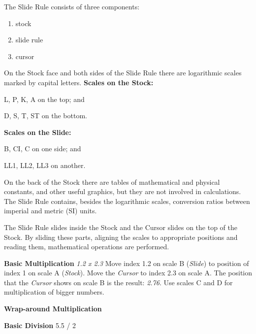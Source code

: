 \documentclass[a4paper,9pt]{article}
\begin{document}
  \begin{multicols*}{3}
  The Slide Rule consists of three components:
    \begin{enumerate}
      \setlength{\parskip}{0pt}
      \setlength{\parsep}{0pt}
      \item stock
      \item slide rule
      \item cursor
    \end{enumerate}

  On the Stock face and both sides of the Slide Rule there are logarithmic scales marked by capital letters. \textbf{Scales on the Stock:}
  \begin{inparaenum}
    \item L, P, K, A on the top; and
    \item D, S, T, ST on the bottom.
  \end{inparaenum}
  \textbf{Scales on the Slide:}
  \begin{inparaenum}
    \item B, CI, C on one side; and
    \item LL1, LL2, LL3 on another.
  \end{inparaenum}

  On the back of the Stock there are tables of mathematical and physical constants, and other useful graphics, but they are not involved in calculations. The Slide Rule contains, besides the logarithmic scales, conversion ratios between imperial and metric (SI) units.

  The Slide Rule slides inside the Stock and the Cursor slides on the top of the Stock. By sliding these parts, aligning the scales to appropriate positions and reading them, mathematical operations are performed.

  \textbf{Basic Multiplication} \textit{1.2 x 2.3} Move index 1.2 on scale B (\textit{Slide}) to position of index 1 on scale A (\textit{Stock}). Move the \textit{Cursor} to index 2.3 on scale A. The position that the \textit{Cursor} shows on scale B is the result: \textit{2.76}. Use scales C and D for multiplication of bigger numbers.

  \textbf{Wrap-around Multiplication}

  \textbf{Basic Division} 5.5 / 2 

  \end{multicols*}
  
\end{document}
